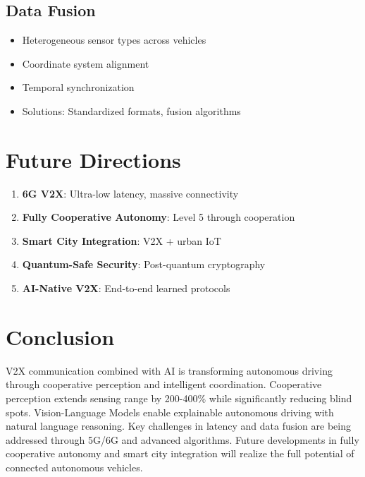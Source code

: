 \documentclass[12pt,a4paper]{article}
\begin{document}
\subsection{Data Fusion}

\begin{itemize}
    \item Heterogeneous sensor types across vehicles
    \item Coordinate system alignment
    \item Temporal synchronization
    \item Solutions: Standardized formats, fusion algorithms
\end{itemize}

\section{Future Directions}

\begin{enumerate}
    \item \textbf{6G V2X}: Ultra-low latency, massive connectivity
    \item \textbf{Fully Cooperative Autonomy}: Level 5 through cooperation
    \item \textbf{Smart City Integration}: V2X + urban IoT
    \item \textbf{Quantum-Safe Security}: Post-quantum cryptography
    \item \textbf{AI-Native V2X}: End-to-end learned protocols
\end{enumerate}

\section{Conclusion}

V2X communication combined with AI is transforming autonomous driving through cooperative perception and intelligent coordination. Cooperative perception extends sensing range by 200-400\% while significantly reducing blind spots. Vision-Language Models enable explainable autonomous driving with natural language reasoning. Key challenges in latency and data fusion are being addressed through 5G/6G and advanced algorithms. Future developments in fully cooperative autonomy and smart city integration will realize the full potential of connected autonomous vehicles.
\end{document}
